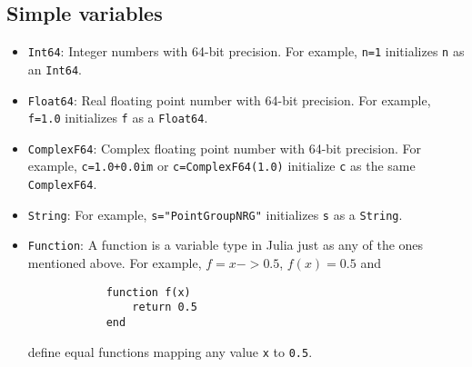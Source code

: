 \documentclass[notitlepage]{article}
\begin{document}
\subsection{Simple variables}
\begin{itemize}
    \item \texttt{Int64}: Integer numbers with 64-bit
        precision. For example, \texttt{n=1} initializes
        \texttt{n} as an \texttt{Int64}.
    \item \texttt{Float64}: Real floating point number with
        64-bit precision. For example, \texttt{f=1.0}
        initializes \texttt{f} as a \texttt{Float64}.
    \item \texttt{ComplexF64}: Complex floating point number
        with 64-bit precision. For example,
        \texttt{c=1.0+0.0im} or \texttt{c=ComplexF64(1.0)}
        initialize \texttt{c} as the same
        \texttt{ComplexF64}.
    \item \texttt{String}: For example,
        \texttt{s="PointGroupNRG"} initializes \texttt{s} as
        a \texttt{String}.
    \item \texttt{Function}: A function is a variable type
        in Julia just as any of the ones mentioned above.
        For example, $f=x->0.5$, $f(x)=0.5$ and 
        \begin{verbatim}
            function f(x)
                return 0.5
            end
        \end{verbatim}
        define equal functions mapping any value \texttt{x}
        to \texttt{0.5}.
\end{itemize}
\end{document}
